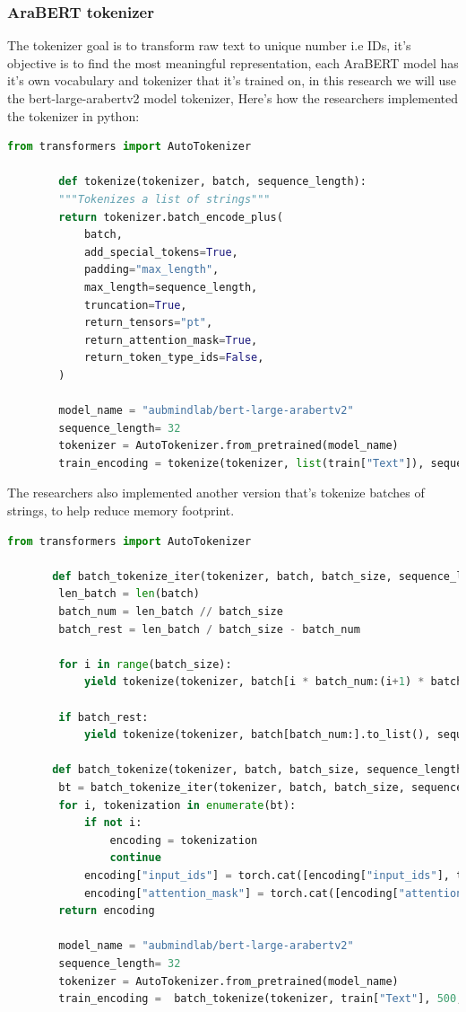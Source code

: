 \documentclass[12pt]{diazessay}
\begin{document}
        \subsubsection{AraBERT tokenizer}
        The tokenizer goal is to transform raw text to unique number i.e IDs, it's objective is to find the most meaningful representation, each AraBERT model has it's own vocabulary and tokenizer that it's trained on, in this research we will use the bert-large-arabertv2 model tokenizer, Here's how the researchers implemented the tokenizer in python:
        \begin{lstlisting}[language=Python]
        from transformers import AutoTokenizer
        
        def tokenize(tokenizer, batch, sequence_length):
        """Tokenizes a list of strings"""
        return tokenizer.batch_encode_plus(
            batch,
            add_special_tokens=True,
            padding="max_length",
            max_length=sequence_length,
            truncation=True,
            return_tensors="pt",
            return_attention_mask=True,
            return_token_type_ids=False,
        )
        
        model_name = "aubmindlab/bert-large-arabertv2"
        sequence_length= 32
        tokenizer = AutoTokenizer.from_pretrained(model_name)
        train_encoding = tokenize(tokenizer, list(train["Text"]), sequence_length)
        \end{lstlisting}
        The researchers also implemented another version that's tokenize batches of strings, to help reduce memory footprint.
        \begin{lstlisting}[language=Python]
       from transformers import AutoTokenizer
        
       def batch_tokenize_iter(tokenizer, batch, batch_size, sequence_length):
        len_batch = len(batch)
        batch_num = len_batch // batch_size
        batch_rest = len_batch / batch_size - batch_num
    
        for i in range(batch_size):
            yield tokenize(tokenizer, batch[i * batch_num:(i+1) * batch_num].to_list(), sequence_length)
        
        if batch_rest:
            yield tokenize(tokenizer, batch[batch_num:].to_list(), sequence_length)

       def batch_tokenize(tokenizer, batch, batch_size, sequence_length):
        bt = batch_tokenize_iter(tokenizer, batch, batch_size, sequence_length)
        for i, tokenization in enumerate(bt):
            if not i:
                encoding = tokenization
                continue
            encoding["input_ids"] = torch.cat([encoding["input_ids"], tokenization["input_ids"]])
            encoding["attention_mask"] = torch.cat([encoding["attention_mask"], tokenization["attention_mask"]])
        return encoding

        model_name = "aubmindlab/bert-large-arabertv2"
        sequence_length= 32
        tokenizer = AutoTokenizer.from_pretrained(model_name)
        train_encoding =  batch_tokenize(tokenizer, train["Text"], 500, sequence_length)
        \end{lstlisting}
\end{document}
